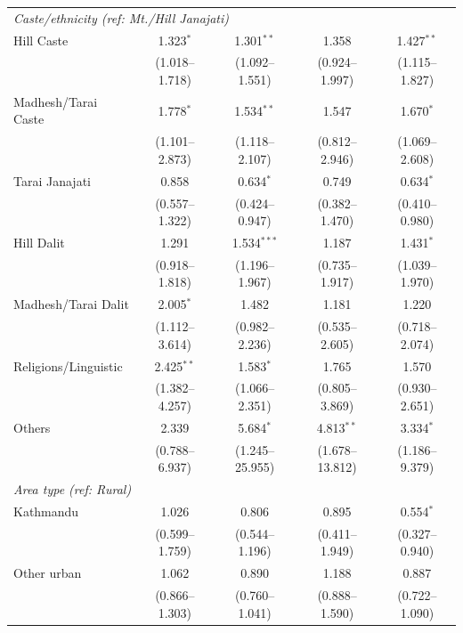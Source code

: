 \begin{table}[htbp]
\begin{tabular}{lcccc}
\multicolumn{5}{l}{\textit{Caste/ethnicity (ref: Mt./Hill Janajati)}} \\
\quad Hill Caste & 1.323$^{*}$ & 1.301$^{**}$ & 1.358 & 1.427$^{**}$ \\
\quad & (1.018--1.718) & (1.092--1.551) & (0.924--1.997) & (1.115--1.827) \\
\quad Madhesh/Tarai Caste & 1.778$^{*}$ & 1.534$^{**}$ & 1.547 & 1.670$^{*}$ \\
\quad & (1.101--2.873) & (1.118--2.107) & (0.812--2.946) & (1.069--2.608) \\
\quad Tarai Janajati & 0.858 & 0.634$^{*}$ & 0.749 & 0.634$^{*}$ \\
\quad & (0.557--1.322) & (0.424--0.947) & (0.382--1.470) & (0.410--0.980) \\
\quad Hill Dalit & 1.291 & 1.534$^{***}$ & 1.187 & 1.431$^{*}$ \\
\quad & (0.918--1.818) & (1.196--1.967) & (0.735--1.917) & (1.039--1.970) \\
\quad Madhesh/Tarai Dalit & 2.005$^{*}$ & 1.482 & 1.181 & 1.220 \\
\quad & (1.112--3.614) & (0.982--2.236) & (0.535--2.605) & (0.718--2.074) \\
\quad Religions/Linguistic & 2.425$^{**}$ & 1.583$^{*}$ & 1.765 & 1.570 \\
\quad & (1.382--4.257) & (1.066--2.351) & (0.805--3.869) & (0.930--2.651) \\
\quad Others & 2.339 & 5.684$^{*}$ & 4.813$^{**}$ & 3.334$^{*}$ \\
\quad & (0.788--6.937) & (1.245--25.955) & (1.678--13.812) & (1.186--9.379) \\

\multicolumn{5}{l}{\textit{Area type (ref: Rural)}} \\
\quad Kathmandu & 1.026 & 0.806 & 0.895 & 0.554$^{*}$ \\
\quad & (0.599--1.759) & (0.544--1.196) & (0.411--1.949) & (0.327--0.940) \\
\quad Other urban & 1.062 & 0.890 & 1.188 & 0.887 \\
\quad & (0.866--1.303) & (0.760--1.041) & (0.888--1.590) & (0.722--1.090) \\


\end{tabular}
\end{table}
